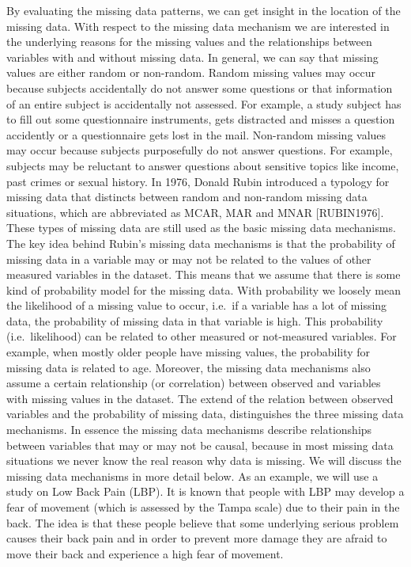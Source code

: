 \documentclass[]{book}
\begin{document}
By evaluating the missing data patterns, we can get insight in the
location of the missing data. With respect to the missing data mechanism
we are interested in the underlying reasons for the missing values and
the relationships between variables with and without missing data. In
general, we can say that missing values are either random or non-random.
Random missing values may occur because subjects accidentally do not
answer some questions or that information of an entire subject is
accidentally not assessed. For example, a study subject has to fill out
some questionnaire instruments, gets distracted and misses a question
accidently or a questionnaire gets lost in the mail. Non-random missing
values may occur because subjects purposefully do not answer questions.
For example, subjects may be reluctant to answer questions about
sensitive topics like income, past crimes or sexual history. In 1976,
Donald Rubin introduced a typology for missing data that distincts
between random and non-random missing data situations, which are
abbreviated as MCAR, MAR and MNAR {[}RUBIN1976{]}. These types of
missing data are still used as the basic missing data mechanisms. The
key idea behind Rubin's missing data mechanisms is that the probability
of missing data in a variable may or may not be related to the values of
other measured variables in the dataset. This means that we assume that
there is some kind of probability model for the missing data. With
probability we loosely mean the likelihood of a missing value to occur,
i.e.~if a variable has a lot of missing data, the probability of missing
data in that variable is high. This probability (i.e.~likelihood) can be
related to other measured or not-measured variables. For example, when
mostly older people have missing values, the probability for missing
data is related to age. Moreover, the missing data mechanisms also
assume a certain relationship (or correlation) between observed and
variables with missing values in the dataset. The extend of the relation
between observed variables and the probability of missing data,
distinguishes the three missing data mechanisms. In essence the missing
data mechanisms describe relationships between variables that may or may
not be causal, because in most missing data situations we never know the
real reason why data is missing. We will discuss the missing data
mechanisms in more detail below. As an example, we will use a study on
Low Back Pain (LBP). It is known that people with LBP may develop a fear
of movement (which is assessed by the Tampa scale) due to their pain in
the back. The idea is that these people believe that some underlying
serious problem causes their back pain and in order to prevent more
damage they are afraid to move their back and experience a high fear of
movement.
\end{document}
